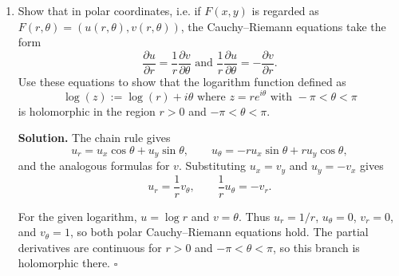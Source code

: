 \documentclass[12pt, reqno]{amsart}
\theoremstyle{definition}
\newenvironment{solution}{\par\smallskip\noindent\textbf{Solution.}}{\hfill$\square$\par\medskip}
\numberwithin{equation}{subsection}
\numberwithin{equation}{section}
\begin{document}
\begin{enumerate}
\begin{enumerate}
\begin{solution}
Finally, direct substitution yields
\[
F(F(z))=
\frac{w-\dfrac{w-z}{1-\overline wz}}
{1-\overline w\dfrac{w-z}{1-\overline wz}}=z.
\]
Thus $F$ is its own inverse and is therefore a bijection of $\mathbb D$.
\end{solution}

\end{enumerate}

\item Show that in polar coordinates, i.e. if $F(x, y)$ is regarded as $F(r, \theta)= ( u(r,\theta), v(r, \theta))$, the Cauchy--Riemann equations take the form  $$ \frac{\partial u}{\partial r}  = \frac{1}{r} \frac{ \partial v}{\partial \theta} \text{ and } \frac{1}{r} \frac{ \partial u}{\partial \theta} = - \frac{\partial v}{\partial r}.$$  Use these equations to show that the logarithm function defined as $$ \log(z) := \log (r) + i \theta \text{ where } z = r e^{ i \theta} \text{ with } - \pi < \theta < \pi $$ is holomorphic in the region $r > 0$ and $- \pi < \theta < \pi$.
\begin{solution}
The chain rule gives
\[
u_r=u_x\cos\theta+u_y\sin\theta,\qquad
u_\theta=-ru_x\sin\theta+ru_y\cos\theta,
\]
and the analogous formulas for $v$.  Substituting $u_x=v_y$ and
$u_y=-v_x$ gives
\[u_r=\frac1r v_\theta,\qquad \frac1r u_\theta=-v_r.\]

For the given logarithm, $u=\log r$ and $v=\theta$.  Thus
$u_r=1/r$, $u_\theta=0$, $v_r=0$, and $v_\theta=1$, so both polar
Cauchy--Riemann equations hold.  The partial derivatives are continuous
for $r>0$ and $-\pi<\theta<\pi$, so this branch is holomorphic there.
\end{solution}


\end{enumerate}
\end{document}
